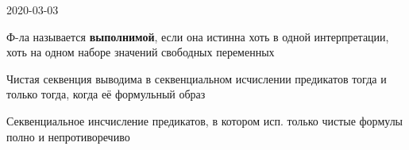 \documentclass[main]{subfiles}
\begin{document}
\begin{lect} {2020-03-03}
    \begin{definition}
        Ф-ла называется {\bf выполнимой}, если она истинна хоть в одной интерпретации, хоть на одном наборе значений свободных переменных
    \end{definition}

    \begin{theorem}
        Чистая секвенция выводима в секвенциальном исчислении предикатов тогда и только тогда, когда её формульный образ
    \end{theorem}

    \begin{consequence}
        Секвенциальное инсчисление предикатов, в котором исп. только чистые формулы полно и непротиворечиво
    \end{consequence}
\end{lect}
\end{document}

